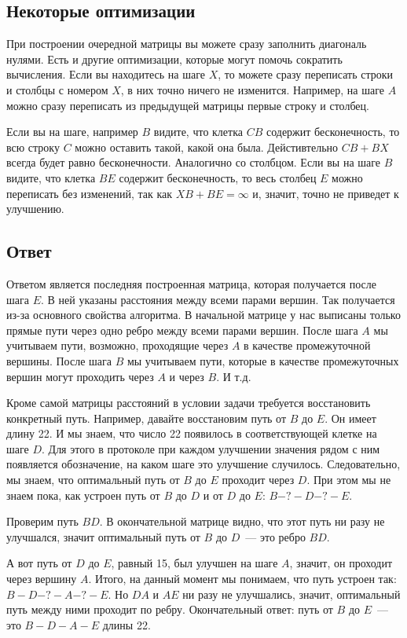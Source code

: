 \documentclass{article}
\begin{document}
\subsection{Некоторые оптимизации}
При построении очередной матрицы вы можете сразу заполнить диагональ нулями. Есть и другие оптимизации, которые могут помочь сократить вычисления.
Если вы находитесь на шаге $X$, то можете сразу переписать строки и столбцы с номером $X$, в них точно ничего не изменится. Например, на шаге $A$ можно сразу переписать из предыдущей матрицы первые строку и столбец.

Если вы на шаге, например $B$ видите, что клетка $CB$ содержит бесконечность, то всю строку $C$ можно оставить такой, какой она была. Дейстивтельно $CB + BX$ всегда будет равно бесконечности. Аналогично со столбцом. Если вы на шаге $B$ видите, что клетка $BE$ содержит бесконечность, то весь столбец $E$ можно переписать без изменений, так как $XB + BE = \infty$ и, значит, точно не приведет к улучшению.

\subsection{Ответ}

Ответом является последняя построенная матрица, которая получается после шага $E$. В ней указаны расстояния между всеми парами вершин. Так получается из-за основного свойства алгоритма. В начальной матрице у нас выписаны только прямые пути через одно ребро между всеми парами вершин. После шага $A$ мы учитываем пути, возможно, проходящие через $A$ в качестве промежуточной вершины. После шага $B$ мы учитываем пути, которые в качестве промежуточных вершин могут проходить через $A$ и через $B$. И т.д.

Кроме самой матрицы расстояний в условии задачи требуется восстановить конкретный путь. Например, давайте восстановим путь от $B$ до $E$. Он имеет длину 22. И мы знаем, что число 22 появилось в соответствующей клетке на шаге $D$. Для этого в протоколе при каждом улучшении значения рядом с ним появляется обозначение, на каком шаге это улучшение случилось. Следовательно, мы знаем, что оптимальный путь от $B$ до $E$ проходит через $D$. При этом мы не знаем пока, как устроен путь от $B$ до $D$ и от $D$ до $E$: $B {-?-} D {-?-} E$.

Проверим путь $BD$. В окончательной матрице видно, что этот путь ни разу не улучшался, значит оптимальный путь от $B$ до $D$~--- это ребро $BD$.

А вот путь от $D$ до $E$, равный 15, был улучшен на шаге $A$, значит, он проходит через вершину $A$. Итого, на данный момент мы понимаем, что путь устроен так: $B-D {-?-} A {-?-} E$. Но $DA$ и $AE$ ни разу не улучшались, значит, оптимальный путь между ними проходит по ребру. Окончательный ответ: путь от $B$ до $E$~--- это $B-D-A-E$ длины 22.
\end{document}
